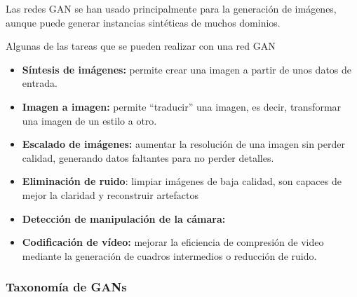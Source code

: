 Las redes \gls{GAN} se han usado principalmente para la generación de imágenes, aunque puede generar instancias sintéticas de muchos dominios.


Algunas de las tareas que se pueden realizar con una red \gls{GAN}

\begin{itemize}
    \item \textbf{Síntesis de imágenes:} permite crear una imagen a partir de unos datos de entrada.
    \item \textbf{Imagen a imagen:} permite ``traducir'' una imagen, es decir, transformar una imagen de un estilo a otro.
    \item \textbf{Escalado de imágenes:} aumentar la resolución de una imagen sin perder calidad, generando datos faltantes para no perder detalles.
    \item \textbf{Eliminación de ruido}: limpiar imágenes de baja calidad, son capaces de mejor la claridad y reconstruir artefactos
    \item \textbf{Detección de manipulación de la cámara:} 
    \item \textbf{Codificación de vídeo:} mejorar la eficiencia de compresión de video mediante la generación de cuadros intermedios o reducción de ruido.
\end{itemize}


\subsubsection{Taxonomía de GANs}


